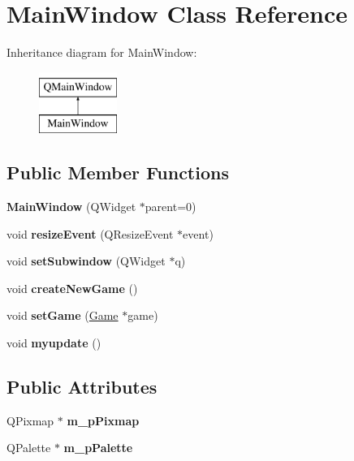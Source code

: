 \hypertarget{classMainWindow}{}\section{Main\+Window Class Reference}
\label{classMainWindow}
Inheritance diagram for Main\+Window\+:\begin{figure}[H]
\begin{center}
\leavevmode
\includegraphics[height=2.000000cm]{classMainWindow}
\end{center}
\end{figure}
\subsection*{Public Member Functions}
\begin{DoxyCompactItemize}
\item 
\mbox{\label{classMainWindow_a8b244be8b7b7db1b08de2a2acb9409db}} 
{\bfseries Main\+Window} (Q\+Widget $\ast$parent=0)
\item 
\mbox{\label{classMainWindow_ae12f8f63791595567b6250f8bb002bda}} 
void {\bfseries resize\+Event} (Q\+Resize\+Event $\ast$event)
\item 
\mbox{\label{classMainWindow_a889d39caf6b396921d972800e2fba819}} 
void {\bfseries set\+Subwindow} (Q\+Widget $\ast$q)
\item 
\mbox{\label{classMainWindow_aa8bd15bfe653d4a823453aa2de06b807}} 
void {\bfseries create\+New\+Game} ()
\item 
\mbox{\label{classMainWindow_a33c0c4b08a759f5c32446d284a811947}} 
void {\bfseries set\+Game} (\hyperlink{classGame}{Game} $\ast$game)
\item 
\mbox{\label{classMainWindow_aa78b3f5e5a1226396581fde03f7f1172}} 
void {\bfseries myupdate} ()
\end{DoxyCompactItemize}
\subsection*{Public Attributes}
\begin{DoxyCompactItemize}
\item 
\mbox{\label{classMainWindow_a0df1000428a75f4b5ca749b84f1f4a28}} 
Q\+Pixmap $\ast$ {\bfseries m\+\_\+p\+Pixmap}
\item 
\mbox{\label{classMainWindow_a4687ca985e01079dd109899fa997b5ef}} 
Q\+Palette $\ast$ {\bfseries m\+\_\+p\+Palette}
\end{DoxyCompactItemize}
